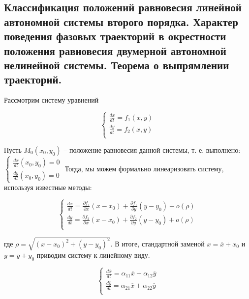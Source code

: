 \documentclass[a4paper, 12pt]{article}
\begin{document}
    \subsection{Классификация положений равновесия линейной
    автономной системы второго порядка. Характер поведения фазовых траекторий в окрестности положения равновесия двумерной автономной нелинейной системы. Теорема о выпрямлении траекторий.}

    Рассмотрим систему уравнений

    \begin{equation}
      \begin{cases}
        \frac{d x}{d t} = f_1 (x, y) \\
        \frac{d y}{d t} = f_2 (x, y) \\
      \end{cases} 
    \end{equation}

    Пусть $M_0(x_0, y_0)$ -- положение равновесия данной системы, т. е. выполнено:
    $\begin{cases}
      \frac{d x}{d t}(x_0, y_0) = 0 \\
      \frac{d y}{d t}(x_0, y_0) = 0
    \end{cases}$
    Тогда, мы можем формально линеаризовать систему, используя известные методы:

    \begin{equation}
      \begin{cases}
        \frac{d x}{d t} = \frac{\partial f_1}{\partial x} (x - x_0) + \frac{\partial f_1}{\partial y} (y - y_0) + o(\rho) \\
        \frac{d y}{d t} = \frac{\partial f_2}{\partial x} (x - x_0) + \frac{\partial f_2}{\partial y} (y - y_0) + o(\rho) \\        
      \end{cases}
    \end{equation}

    где $\rho = \sqrt{(x - x_0)^2 + (y - y_0)^2}$. В итоге, стандартной заменой $x = \overline{x} + x_0$ и $y = \overline{y} + y_0$ приводим систему к линейному виду.

    \begin{equation}
      \begin{cases}
        \frac{d \overline{x}}{d t} = \alpha_{11} \overline{x} + \alpha_{12} \overline{y} \\
        \frac{d \overline{y}}{d t} = \alpha_{21} \overline{x} + \alpha_{22} \overline{y} \\        
      \end{cases}
    \end{equation}
\end{document}
